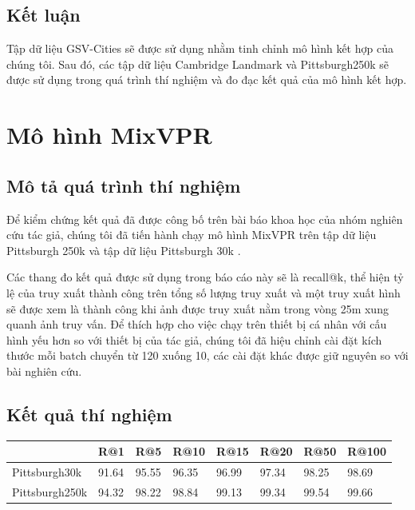 \subsection{Kết luận}
Tập dữ liệu GSV-Cities \cite{Ali_bey_2022} sẽ được sử dụng nhằm tinh chỉnh mô hình kết hợp của chúng tôi. Sau đó, các tập dữ liệu Cambridge Landmark \cite{kendall2016posenet} và Pittsburgh250k \cite{6618963} sẽ được sử dụng trong quá trình thí nghiệm và đo đạc kết quả của mô hình kết hợp.

\section{Mô hình MixVPR}
\subsection*{Mô tả quá trình thí nghiệm}

Để kiểm chứng kết quả đã được công bố trên bài báo khoa học của nhóm nghiên cứu tác giả, chúng tôi đã tiến hành chạy mô hình MixVPR \cite{alibey2023mixvpr} trên tập dữ liệu Pittsburgh 250k \cite{6618963} và tập dữ liệu Pittsburgh 30k \cite{6618963}.

Các thang đo kết quả được sử dụng trong báo cáo này sẽ là recall@k, thể hiện tỷ lệ của truy xuất thành công trên tổng số lượng truy xuất và một truy xuất hình sẽ được xem là thành công khi ảnh được truy xuất nằm trong vòng 25m xung quanh ảnh truy vấn. Để thích hợp cho việc chạy trên thiết bị cá nhân với cấu hình yếu hơn so với thiết bị của tác giả, chúng tôi đã hiệu chỉnh cài đặt kích thước mỗi batch chuyển từ 120 xuống 10, các cài đặt khác được giữ nguyên so với bài nghiên cứu.

\subsection*{Kết quả thí nghiệm}

\begin{table}[H]
	\begin{tabular}{|l|l|l|l|l|l|l|l|}
	\hline
	               & \textbf{R@1} & \textbf{R@5} & \textbf{R@10} & \textbf{R@15} & \textbf{R@20} & \textbf{R@50} & \textbf{R@100} \\ \hline
	Pittsburgh30k  & 91.64        & 95.55        & 96.35         & 96.99         & 97.34         & 98.25         & 98.69          \\ \hline
	Pittsburgh250k & 94.32        & 98.22        & 98.84         & 99.13         & 99.34         & 99.54         & 99.66          \\ \hline
	\end{tabular}
\end{table}

